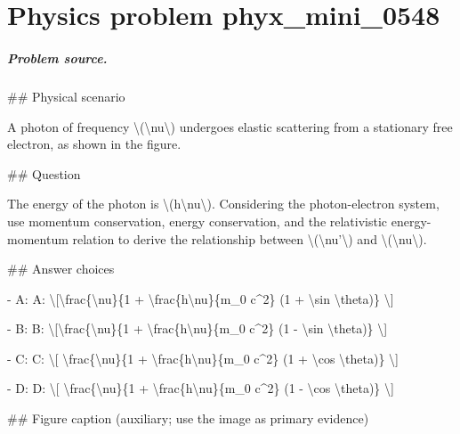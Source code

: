 
\chapter{Physics problem phyx\_mini\_0548}
\label{ch:PhyXMiniProblems_problem_phyx_mini_0548}

\paragraph{Problem source.}
\#\# Physical scenario

A photon of frequency \textbackslash{}(\textbackslash{}nu\textbackslash{}) undergoes elastic scattering from a stationary free electron, as shown in the figure.

\#\# Question

The energy of the photon is \textbackslash{}(h\textbackslash{}nu\textbackslash{}). Considering the photon-electron system, use momentum conservation, energy conservation, and the relativistic energy-momentum relation to derive the relationship between \textbackslash{}(\textbackslash{}nu'\textbackslash{}) and \textbackslash{}(\textbackslash{}nu\textbackslash{}).

\#\# Answer choices

- A: A: \textbackslash{}[\textbackslash{}frac\{\textbackslash{}nu\}\{1 + \textbackslash{}frac\{h\textbackslash{}nu\}\{m\_0 c\textasciicircum{}2\} (1 + \textbackslash{}sin \textbackslash{}theta)\} \textbackslash{}]

- B: B: \textbackslash{}[\textbackslash{}frac\{\textbackslash{}nu\}\{1 + \textbackslash{}frac\{h\textbackslash{}nu\}\{m\_0 c\textasciicircum{}2\} (1 - \textbackslash{}sin \textbackslash{}theta)\} \textbackslash{}]

- C: C: \textbackslash{}[ \textbackslash{}frac\{\textbackslash{}nu\}\{1 + \textbackslash{}frac\{h\textbackslash{}nu\}\{m\_0 c\textasciicircum{}2\} (1 + \textbackslash{}cos \textbackslash{}theta)\} \textbackslash{}]

- D: D: \textbackslash{}[  \textbackslash{}frac\{\textbackslash{}nu\}\{1 + \textbackslash{}frac\{h\textbackslash{}nu\}\{m\_0 c\textasciicircum{}2\} (1 - \textbackslash{}cos \textbackslash{}theta)\} \textbackslash{}]

\#\# Figure caption (auxiliary; use the image as primary evidence)

